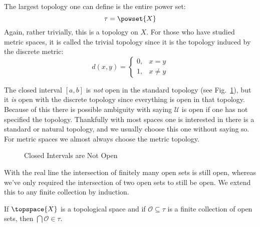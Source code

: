         \begin{example}
            The largest topology one can define is the entire power set:
            \begin{equation}
                \tau=\powset{X}
            \end{equation}
            Again, rather trivially, this is a topology on $X$. For
            those who have studied metric spaces, it is called the
            trivial topology since it is the topology induced by the
            discrete metric:%
            \begin{equation}
                d(x,y)=
                \begin{cases}
                    0,&x=y\\
                    1,&x\ne{y}
                \end{cases}
            \end{equation}
        \end{example}
        The closed interval $[a,b]$ is \textit{not} open in the standard
        topology (see Fig.~\ref{fig:Closed_Interval_Not_Open}), but it
        \textit{is} open with the discrete topology since everything is
        open in that topology. Because of this there is possible
        ambiguity with saying $\mathcal{U}$ is open if one has not
        specified the topology. Thankfully with most spaces one is
        interested in there is a standard or natural topology, and we
        usually choose this one without saying so. For metric spaces we
        almost always choose the metric topology.
        \begin{figure}[H]
            \centering
            \captionsetup{type=figure}
            
            \caption{Closed Intervals are Not Open}
            \label{fig:Closed_Interval_Not_Open}
        \end{figure}
        With the real line the intersection of finitely many open sets
        is still open, whereas we've only required the intersection of
        two open sets to still be open. We extend this to any finite
        collection by induction.
        \begin{theorem}
            \label{thm:Finite_Intersections_Is_Open}%
            If $\topspace{X}$ is a topological space and if
            $\mathcal{O}\subseteq\tau$ is a finite collection of open
            sets, then $\bigcap\mathcal{O}\in\tau$.
        \end{theorem}

